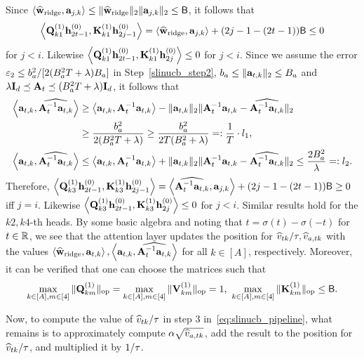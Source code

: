 Since $\left\langle\widehat{{\mathbf w}}_{{\rm ridge}},{\mathbf a}_{j,k}\right\rangle\leq \|\widehat{{\mathbf w}}_{{\rm ridge}}\|_2\|{\mathbf a}_{j,k}\|_2\leq{\mathsf{B}}$, it follows that $$\left\langle{\mathbf Q}^{(1)}_{k1}{\mathbf h}^{(0)}_{2t-1},{\mathbf K}^{(1)}_{k1}{\mathbf h}^{(0)}_{2j-1}\right\rangle=\left\langle\widehat{{\mathbf w}}_{{\rm ridge}},{\mathbf a}_{j,k}\right\rangle+(2j-1-(2t-1)){\mathsf{B}}\leq 0$$ for $j<i$. Likewise $\left\langle{\mathbf Q}^{(1)}_{k1}{\mathbf h}^{(0)}_{2t-1},{\mathbf K}^{(1)}_{k1}{\mathbf h}^{(0)}_{2j}\right\rangle\leq0$ for $j<i$. 
Since we assume the error $\varepsilon_2\leq b_a^2/[2(B_a^2T+\lambda)B_a]$
in Step~\ref{slinucb_step2}, $b_a\leq\|{\mathbf a}_{t,k}\|_2\leq B_a$ and $\lambda{\mathbf I}_d\preceq{\mathbf A}_t\preceq (B_a^2T+\lambda){\mathbf I}_d$, it follows that 
\begin{align}
    \left\langle{\mathbf a}_{t,k},\widehat{{\mathbf A}_t^{-1}{\mathbf a}_{t,k}}\right\rangle 
    &\geq 
    \left\langle{\mathbf a}_{t,k},{{\mathbf A}_t^{-1}{\mathbf a}_{t,k}}\right\rangle-\|{\mathbf a}_{t,k}\|_2\|{\mathbf A}_t^{-1}{\mathbf a}_{t,k}-\widehat{{\mathbf A}_t^{-1}{\mathbf a}_{t,k}}\|_2\notag\\
    &\geq \frac{b_a^2}{2(B_a^2T+\lambda)}\geq \frac{b_a^2}{2T(B_a^2+\lambda)}=:\frac{1}{T}\cdot{{l_1}},\label{eq:lb_qudratic}
    \\
     \left\langle{\mathbf a}_{t,k},\widehat{{\mathbf A}_t^{-1}{\mathbf a}_{t,k}}\right\rangle
     &\leq 
     \left\langle{\mathbf a}_{t,k},{{\mathbf A}_t^{-1}{\mathbf a}_{t,k}}\right\rangle+\|{\mathbf a}_{t,k}\|_2\|{\mathbf A}_t^{-1}{\mathbf a}_{t,k}-\widehat{{\mathbf A}_t^{-1}{\mathbf a}_{t,k}}\|_2\leq \frac{2B_a^2}{\lambda}=:{l_2}.\label{eq:ub_qudratic}
\end{align}
Therefore,  $\left\langle{\mathbf Q}^{(1)}_{k3}{\mathbf h}^{(0)}_{2t-1},{\mathbf K}^{(1)}_{k3}{\mathbf h}^{(0)}_{2j-1}\right\rangle=\left\langle\widehat{{\mathbf A}_t^{-1}{\mathbf a}_{t,k}},{\mathbf a}_{j,k}\right\rangle+(2j-1-(2t-1)){\mathsf{B}}\geq 0$ iff $j=i$. Likewise $\left\langle{\mathbf Q}^{(1)}_{k3}{\mathbf h}^{(0)}_{2t-1},{\mathbf K}^{(1)}_{k3}{\mathbf h}^{(0)}_{2j}\right\rangle\leq 0$  for $j<i$. Similar results hold for the $k2,k4$-th heads.  By some basic algebra and noting that $t=\sigma(t)-\sigma(-t)$ for $t\in\mathbb{R}$, we see that the attention layer updates the position for $\widehat v_{tk}/{\tau},\widehat v_{a,tk}$ with the values $\left\langle\widehat{{\mathbf w}}_{{\rm ridge}},{\mathbf a}_{t,k}\right\rangle, \left\langle{\mathbf a}_{t,k},\widehat{{\mathbf A}_t^{-1}{\mathbf a}_{t,k}}\right\rangle$ for all $k\in[A]$, respectively.  Moreover, it can be verified that one can choose the matrices such that $$\max_{k\in[A],m\in[4]}\|{{\mathbf Q}_{km}^{(1)}}\|_{\mathrm{op}}=\max_{k\in[A],m\in[4]}\|{{\mathbf V}_{km}^{(1)}}\|_{\mathrm{op}}=1,~\max_{k\in[A],m\in[4]}\|{{\mathbf K}^{(1)}_{km}}\|_{\mathrm{op}}\leq{\mathsf{B}}.$$ 




Now, to compute the value of $\widehat v_{tk}/{\tau}$ in step 3 in~\eqref{eq:slinucb_pipeline}, what remains  is to  approximately compute ${\alpha}\sqrt{\widehat v_{a,tk}}$, add the result to the position for $\widehat v_{tk}/{\tau}$, and multiplied it by $1/{\tau}$.

